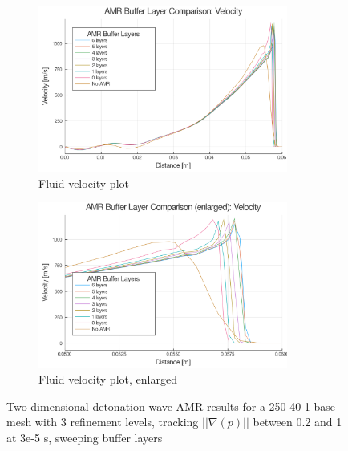\begin{figure} \ContinuedFloat
    
    \centering
    \begin{subfigure}[]{\textwidth}
        \centering
        \includegraphics[width=0.9\textwidth]{./figs/amrfigs/amr_bufflayers/u.png}
        \caption{Fluid velocity plot}
    \end{subfigure}

    \centering
    \begin{subfigure}[]{\textwidth}
        \centering
        \includegraphics[width=0.9\textwidth]{./figs/amrfigs/amr_bufflayers/ue.png}
        \caption{Fluid velocity plot, enlarged}
    \end{subfigure}

    \caption{Two-dimensional detonation wave AMR results for a 250-40-1 base mesh with 3 refinement levels, tracking \( ||\nabla(p)||\) between 0.2 and 1 at 3e-5 s, sweeping buffer layers}
    \label{fig:amr_bufflayers}
\end{figure}%
